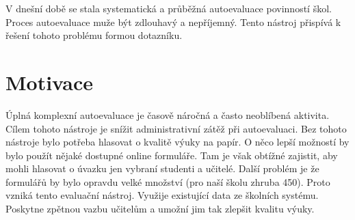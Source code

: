 V dnešní době se stala systematická a průběžná autoevaluace povinností škol.
Proces autoevaluace muže být zdlouhavý a nepříjemný.\cite{sbornik-autoevaluace} 
Tento nástroj přispívá k řešení tohoto problému formou dotazníku. 


\section{Motivace}
Úplná komplexní autoevaluace je časově náročná a často neoblíbená aktivita.\cite{sbornik-autoevaluace} Cílem tohoto nástroje je snížit administrativní zátěž při autoevaluaci.  Bez tohoto nástroje bylo potřeba hlasovat o kvalitě výuky na papír. O něco lepší možností by bylo použít nějaké dostupné online formuláře. Tam je však obtížné zajistit, aby mohli hlasovat o úvazku jen vybraní studenti a učitelé. Další problém je že formulářů by bylo opravdu velké množství (pro naší školu zhruba 450). Proto vzniká tento evaluační nástroj. Využije existující data ze školních systému. Poskytne zpětnou vazbu učitelům a umožní jim tak zlepšit kvalitu výuky.
